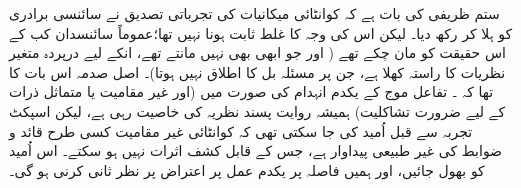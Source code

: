 ستم ظریفی کی بات ہے کہ کوانٹائی میکانیات کی تجرباتی تصدیق نے سائنسی برادری کو ہلا کر رکھ دیا۔ لیکن اس کی وجہ  کا غلط ثابت ہونا نہیں تھا؛عموماً سائنسدان کب کے اس حقیقت کو مان چکے تھے ( اور جو ابھی بھی نہیں مانتے تھے، انکے لیے  درپردہ متغیر نظریات کا راستہ کھلا ہے، جن پر مسئلہ بل کا اطلاق نہیں ہوتا)۔ اصل صدمہ اس بات کا تھا کہ ۔ تفاعل موج کے یکدم انہدام کی صورت میں (اور غیر مقامیت یا متماثل ذرات کے لیے ضرورت تشاکلیت) ہمیشہ روایت پسند نظریہ کی خاصیت رہی ہے، لیکن اسپکٹ تجربہ سے قبل اُمید کی جا سکتی تھی کہ کوانٹائی غیر مقامیت کسی طرح قائد و ضوابط کی غیر طبیعی پیداوار ہے، جس کے قابل کشف اثرات نہیں ہو سکتے۔ اس اُمید کو بھول جائیں، اور ہمیں فاصلہ پر یکدم عمل پر اعتراض پر نظر ثانی کرنی ہو گی۔

